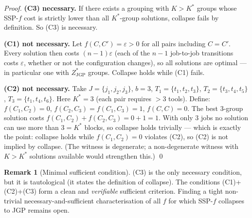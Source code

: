 \documentclass[11pt,a4paper]{article}
\theoremstyle{plain}
\theoremstyle{definition}
\newtheorem{remark}[theorem]{Remark}
\newcommand{\Kstar}{K^*}
\newcommand{\ZJGP}{Z_{\mathrm{JGP}}^*}
\begin{document}
\begin{proofbox}
\begin{proof}
\textbf{(C3) necessary.} If there exists a grouping with $K>\Kstar$ groups
whose SSP-$f$ cost is strictly lower than all $\Kstar$-group solutions, collapse
fails by definition. So (C3) is necessary.

\medskip
\textbf{(C1) not necessary.}
Let $f(C,C')=\varepsilon>0$ for all pairs including $C=C'$. Every solution then costs
$(n-1)\varepsilon$ (each of the $n-1$ job-to-job transitions costs $\varepsilon$,
whether or not the configuration changes), so all solutions are optimal --- in
particular one with $\ZJGP$ groups. Collapse holds while (C1) fails.

\medskip
\textbf{(C2) not necessary.} Take $J=\{j_1,j_2,j_3\}$, $b=3$,
$T_1=\{t_1,t_2,t_3\}$, $T_2=\{t_3,t_4,t_5\}$, $T_3=\{t_1,t_4,t_6\}$.
Here $\Kstar=3$ (each pair requires $>3$ tools). Define:
$f(C_1,C_2)=0$, $f(C_2,C_3)=f(C_1,C_3)=1$, $f(C,C)=0$.
The best 3-group solution costs $f(C_1,C_2)+f(C_2,C_3)=0+1=1$.
With only $3$ jobs no solution can use more than $3=\Kstar$ blocks, so collapse holds
trivially --- which is exactly the point: collapse holds while $f(C_1,C_2)=0$
violates (C2), so (C2) is not implied by collapse. (The witness is degenerate; a
non-degenerate witness with $K>\Kstar$ solutions available would strengthen this.) \qed
\end{proof}
\end{proofbox}

\begin{remark}[Minimal sufficient condition]
(C3) is the only necessary condition, but it is tautological (it states the
definition of collapse). The conditions (C1)+(C2)+(C3) form a clean and
\emph{verifiable} sufficient criterion. Finding a tight non-trivial
necessary-and-sufficient characterisation of all $f$ for which SSP-$f$
collapses to JGP remains open.
\end{remark}
\end{document}
